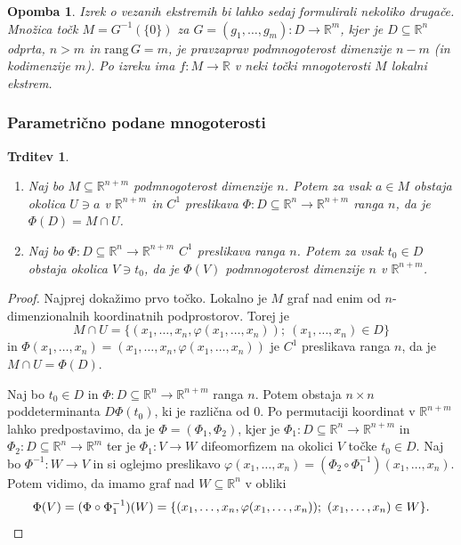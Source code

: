 \documentclass[10pt, a4paper]{article}
\newtheorem{trditev}[izr]{Trditev}
\newtheorem*{opomba}{Opomba}
\newenvironment{noticeC}{%
  \tcolorbox[%
  notitle,
  empty,
  enhanced,  %
  breakable,
  coltext=black, 
  fontupper=\rmfamily,
  parbox=false,
  noparskip,
  sharp corners,
  boxrule=-1pt,  %
  frame hidden,
  left=7pt,  %
  right=7pt,
  top=5pt,
  bottom=5pt,
  before skip=2.5ex plus 2pt,
  after skip=2.5ex plus 2pt,
  overlay unbroken and last={%
  },
  ]}
{\endtcolorbox}
\newenvironment{dokaz}%
  {\begin{noticeC}\begin{proof}}%
  {\end{proof}\end{noticeC}}
\newcommand{\R}{\mathbb {R}}
\newcommand{\rang}{\mathrm{\text{rang}}\,}
\begin{document}
\begin{opomba}
  Izrek o vezanih ekstremih bi lahko sedaj formulirali nekoliko drugače.
  Množica točk $M = G^{-1} (\{0\})$ za $G = (g_1, \dots, g_m) : D \to \R^m$,
  kjer je $D \subseteq \R^n$ odprta, $n > m$ in $\rang G = m$, je pravzaprav podmnogoterost 
  dimenzije $n - m$ (in kodimenzije $m$). Po izreku ima $f: M \to \R$
  v neki točki mnogoterosti $M$ lokalni ekstrem.
\end{opomba}

\subsubsection{Parametrično podane mnogoterosti}

\begin{trditev}
    \begin{enumerate}
        \item Naj bo $M \subseteq \R^{n + m}$ podmnogoterost dimenzije $n$.
        Potem za vsak $a \in M$ obstaja okolica $U \ni a$ v $\R^{n + m}$ in $C^1$ preslikava 
        $\Phi: D \subseteq \R^n \to \R^{n + m}$ ranga $n$, da je $\Phi(D) = M \cap U$.
        \item Naj bo $\Phi: D \subseteq \R^n \to \R^{n + m}$ $C^1$ preslikava ranga $n$.
        Potem za vsak $t_0 \in D$ obstaja okolica $V \ni t_0$, da je $\Phi (V)$ podmnogoterost dimenzije $n$ v $\R^{n + m}$.
    \end{enumerate}
\end{trditev}

\begin{dokaz}
  Najprej dokažimo prvo točko.
  Lokalno je $M$ graf nad enim od $n$-dimenzionalnih
  koordinatnih podprostorov.
  Torej je  
  $$M \cap U = \{(x_1, \dots, x_n, \varphi (x_1, \dots, x_n));\ (x_1, \dots, x_n) \in D\}$$
  in $\Phi (x_1, \dots, x_n) = (x_1, \dots, x_n, \varphi (x_1, \dots, x_n))$ je $C^1$
  preslikava ranga $n$, da je $M \cap U = \Phi (D)$.

  Naj bo $t_0 \in D$ in $\Phi: D \subseteq \R^n \to \R^{n + m}$
  ranga $n$. Potem obstaja $n \times n$ poddeterminanta $D \Phi(t_0)$,
  ki je različna od $0$. Po permutaciji koordinat v $\R^{n + m}$
  lahko predpostavimo, da je $\Phi = (\Phi_1, \Phi_2)$, kjer je 
  $\Phi_1 : D \subseteq \R^n \to \R^{n + m}$ in $\Phi_2 : D \subseteq \R^n \to \R^m$
  ter je $\Phi_1 : V \to W$ difeomorfizem na okolici $V$ točke $t_0 \in D$.
  Naj bo $\Phi^{-1} : W \to V$ in si oglejmo preslikavo 
  $\varphi (x_1, \dots, x_n) = (\Phi_2 \circ \Phi_1^{-1}) (x_1, \dots, x_n)$.
  Potem vidimo, da imamo graf nad $W \subseteq \R^n$ v obliki 
  \begin{equation*}
    \Phi (V) = (\Phi \circ \Phi_1^{-1}) (W) = \{(x_1, \dots, x_n, \varphi (x_1, \dots, x_n));\ (x_1, \dots, x_n) \in W\}. \qedhere
  \end{equation*}
\end{dokaz}
\end{document}
